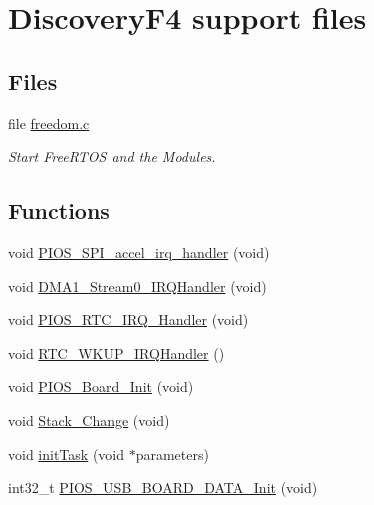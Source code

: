 \hypertarget{group___discovery_f4}{\section{\-Discovery\-F4 support files}
\label{group___discovery_f4}
}
\subsection*{\-Files}
\begin{DoxyCompactItemize}
\item 
file \hyperlink{freedom_8c}{freedom.\-c}
\begin{DoxyCompactList}\small\item\em \-Start \-Free\-R\-T\-O\-S and the \-Modules. \end{DoxyCompactList}\end{DoxyCompactItemize}
\subsection*{\-Functions}
\begin{DoxyCompactItemize}
\item 
void \hyperlink{group___discovery_f4_ga63d09d362d824819ac0ec8162ca337f9}{\-P\-I\-O\-S\-\_\-\-S\-P\-I\-\_\-accel\-\_\-irq\-\_\-handler} (void)
\item 
void \hyperlink{group___discovery_f4_ga1b70a4441662b1d6548e803499da414f}{\-D\-M\-A1\-\_\-\-Stream0\-\_\-\-I\-R\-Q\-Handler} (void)
\item 
void \hyperlink{group___discovery_f4_gadc73bf2eccd9d9ff9d8efedd1e743704}{\-P\-I\-O\-S\-\_\-\-R\-T\-C\-\_\-\-I\-R\-Q\-\_\-\-Handler} (void)
\item 
void \hyperlink{group___discovery_f4_ga7e78266985c97f3b7e8a9f91893657d1}{\-R\-T\-C\-\_\-\-W\-K\-U\-P\-\_\-\-I\-R\-Q\-Handler} ()
\item 
void \hyperlink{group___discovery_f4_ga902009c5b1cb57d9f9d60092eb7cacfb}{\-P\-I\-O\-S\-\_\-\-Board\-\_\-\-Init} (void)
\item 
void \hyperlink{group___discovery_f4_ga7a789e7b91612099a4a1f355b9e97c24}{\-Stack\-\_\-\-Change} (void)
\item 
void \hyperlink{group___discovery_f4_gae7ecc4ed0ea5858477b78acaf928c3ef}{init\-Task} (void $\ast$parameters)
\item 
int32\-\_\-t \hyperlink{group___discovery_f4_ga5efd94ab761f254827f38dba474cf642}{\-P\-I\-O\-S\-\_\-\-U\-S\-B\-\_\-\-B\-O\-A\-R\-D\-\_\-\-D\-A\-T\-A\-\_\-\-Init} (void)
\end{DoxyCompactItemize}
